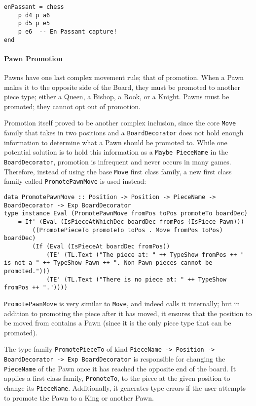 \documentclass[12pt, a4paper, bibliography=totocnumbered]{scrreprt}
\newcommand{\inline}[1]{\lstinline[basicstyle=\ttfamily\footnotesize]{#1}}
\begin{document}
\begin{lstlisting}
enPassant = chess
    p d4 p a6
    p d5 p e5
    p e6  -- En Passant capture!
end
\end{lstlisting}

\paragraph{Pawn Promotion}

Pawns have one last complex movement rule; that of promotion. When a Pawn makes it to the opposite side of the Board, they must be promoted to another piece type; either a Queen, a Bishop, a Rook, or a Knight. Pawns must be promoted; they cannot opt out of promotion.

Promotion itself proved to be another complex inclusion, since the core \inline{Move} family that takes in two positions and a \inline{BoardDecorator} does not hold enough information to determine what a Pawn should be promoted to. While one potential solution is to hold this information as a \inline{Maybe PieceName} in the \inline{BoardDecorator}, promotion is infrequent and never occurs in many games. Therefore, instead of using the base \inline{Move} first class family, a new first class family called \inline{PromotePawnMove} is used instead:

\begin{lstlisting}
data PromotePawnMove :: Position -> Position -> PieceName -> BoardDecorator -> Exp BoardDecorator
type instance Eval (PromotePawnMove fromPos toPos promoteTo boardDec)
    = If' (Eval (IsPieceAtWhichDec boardDec fromPos (IsPiece Pawn)))
        ((PromotePieceTo promoteTo toPos . Move fromPos toPos) boardDec)
        (If (Eval (IsPieceAt boardDec fromPos))
            (TE' (TL.Text ("The piece at: " ++ TypeShow fromPos ++ " is not a " ++ TypeShow Pawn ++ ". Non-Pawn pieces cannot be promoted.")))
            (TE' (TL.Text ("There is no piece at: " ++ TypeShow fromPos ++ "."))))
\end{lstlisting}

\inline{PromotePawnMove} is very similar to \inline{Move}, and indeed calls it internally; but in addition to promoting the piece after it has moved, it ensures that the position to be moved from contains a Pawn (since it is the only piece type that can be promoted).

The type family \inline{PromotePieceTo} of kind \inline{PieceName -> Position -> BoardDecorator -> Exp BoardDecorator} is responsible for changing the \inline{PieceName} of the Pawn once it has reached the opposite end of the board. It applies a first class family, \inline{PromoteTo}, to the piece at the given position to change its \inline{PieceName}. Additionally, it generates type errors if the user attempts to promote the Pawn to a King or another Pawn.
\end{document}
